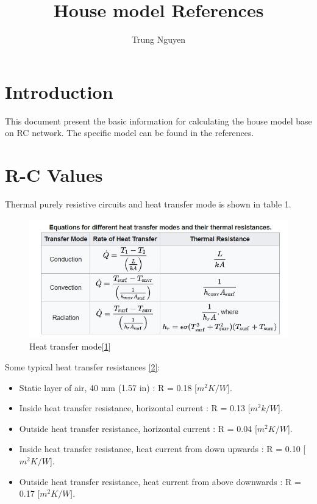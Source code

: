 \documentclass[a4paper,10pt]{article}
\title{House model References}
\author{Trung Nguyen}
\date{}
\begin{document}
\maketitle

\tableofcontents

\section{Introduction}

This document present the basic information for calculating the house model base on RC network. The specific model can be found in the references.


\section{R-C Values}

Thermal purely resistive circuits and heat transfer mode is shown in table 1.
\begin{figure}[H]
	\centering
	\includegraphics[width=0.8\columnwidth]{Pictures/heat transfer mode.JPG}
	\caption[Short title]{Heat transfer mode[\href{https://en.wikipedia.org/wiki/Lumped-element_model}{1}]}
	\label{table 1}
	\end{figure}
	
Some typical heat transfer resistances \href{https://www.engineeringtoolbox.com/overall-heat-transfer-coefficient-d_434.html}{[2]}: 

\begin{itemize}
    \item Static layer of air, 40 mm (1.57 in)  : R = 0.18 [$m^2K/W$].
    \item Inside heat transfer resistance, horizontal current : R = 0.13 [$m^2k/W$]. 
    \item Outside heat transfer resistance, horizontal current : R = 0.04 [$m^2K/W$].
    \item Inside heat transfer resistance, heat current from down upwards : R = 0.10 [$m^2K/W$].
    \item Outside heat transfer resistance, heat current from above downwards : R = 0.17 [$m^2K/W$].

\end{itemize}
\end{document}
